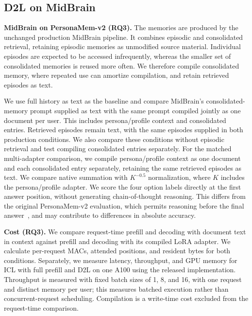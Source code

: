 \subsection{D2L on MidBrain}
\label{sec:deployment}

\textbf{MidBrain on PersonaMem-v2 (RQ3).} The memories are produced by the
unchanged production MidBrain pipeline. It combines episodic and consolidated
retrieval, retaining episodic memories as unmodified source material.
Individual episodes are expected to be accessed infrequently, whereas the
smaller set of consolidated memories is reused more often. We therefore
compile consolidated memory, where repeated use can amortize compilation,
and retain retrieved episodes as text.

We use full history as text as the
baseline and compare MidBrain's
consolidated-memory prompt supplied as text with the same prompt compiled
jointly as one document per user. This includes persona/profile context and
consolidated entries. Retrieved episodes remain text, with the same episodes
supplied in both production conditions. We also compare these conditions
without episodic retrieval and test compiling consolidated entries separately.
For the matched multi-adapter comparison, we compile persona/profile context
as one document and each consolidated entry separately, retaining the same
retrieved episodes as text. We compare native summation with $K^{-0.5}$
normalization, where $K$ includes the persona/profile adapter.
We score the four option labels directly at the first answer position,
without generating chain-of-thought reasoning. This differs from the original
PersonaMem-v2 evaluation, which permits reasoning before the final
answer~\citep{jiang2025personamemv2}, and may contribute to differences in
absolute accuracy.

\textbf{Cost (RQ3).} We compare request-time prefill and decoding with
document text in context against prefill and decoding with its compiled
LoRA adapter. We calculate per-request MACs, attended positions, and
resident bytes for both conditions.
Separately, we measure latency, throughput, and GPU memory for ICL with full prefill and D2L on one
A100 using the released implementation. Throughput is measured with fixed
batch sizes of 1, 8, and 16, with one request and distinct memory per user;
this measures batched execution rather than concurrent-request scheduling.
Compilation is a write-time cost excluded from the request-time comparison.
